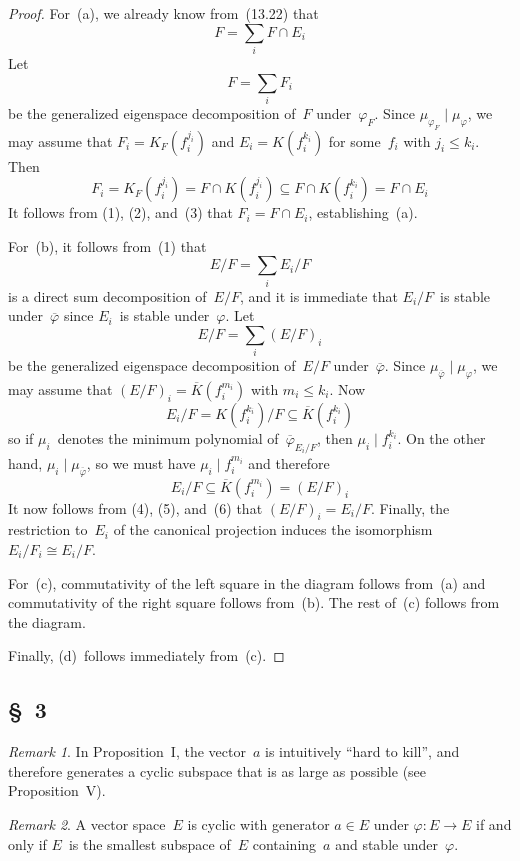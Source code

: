 \documentclass[letterpaper,12pt]{article}
\newcommand{\iso}{\cong}
\newcommand{\divides}{\mid}
\newcommand{\sect}{\cap}
\newcommand{\proj}[1]{\overline{#1}}
\theoremstyle{definition}
\theoremstyle{remark}
\newtheorem*{rmk}{Remark}
\begin{document}
\begin{proof}
For~(a), we already know from~(13.22) that
\[F=\sum_i F\sect E_i\tag{1}\]
Let
\[F=\sum_i F_i\tag{2}\]
be the generalized eigenspace decomposition of~\(F\) under~\(\varphi_F\). Since \(\mu_{\varphi_F}\divides\mu_{\varphi}\), we may assume that \(F_i=K_F(f_i^{j_i})\) and \(E_i=K(f_i^{k_i})\) for some~\(f_i\) with \(j_i\le k_i\). Then
\[F_i=K_F(f_i^{j_i})=F\sect K(f_i^{j_i})\subseteq F\sect K(f_i^{k_i})=F\sect E_i\tag{3}\]
It follows from (1), (2), and~(3) that \(F_i=F\sect E_i\), establishing~(a).

For~(b), it follows from~(1) that
\[E/F=\sum_i E_i/F\tag{4}\]
is a direct sum decomposition of~\(E/F\), and it is immediate that \(E_i/F\)~is stable under~\(\proj{\varphi}\) since \(E_i\)~is stable under~\(\varphi\). Let
\[E/F=\sum_i(E/F)_i\tag{5}\]
be the generalized eigenspace decomposition of~\(E/F\) under~\(\proj{\varphi}\). Since \(\mu_{\proj{\varphi}}\divides\mu_{\varphi}\), we may assume that \((E/F)_i=\proj{K}(f_i^{m_i})\) with \(m_i\le k_i\). Now
\[E_i/F=K(f_i^{k_i})/F\subseteq\proj{K}(f_i^{k_i})\]
so if \(\mu_i\)~denotes the minimum polynomial of~\(\proj{\varphi}_{E_i/F}\), then \(\mu_i\divides f_i^{k_i}\). On the other hand, \(\mu_i\divides\mu_{\proj{\varphi}}\), so we must have \(\mu_i\divides f_i^{m_i}\) and therefore
\[E_i/F\subseteq\proj{K}(f_i^{m_i})=(E/F)_i\tag{6}\]
It now follows from (4), (5), and~(6) that \((E/F)_i=E_i/F\). Finally, the restriction to~\(E_i\) of the canonical projection induces the isomorphism \(E_i/F_i\iso E_i/F\).

For~(c), commutativity of the left square in the diagram follows from~(a) and commutativity of the right square follows from~(b). The rest of~(c) follows from the diagram.

Finally, (d)~follows immediately from~(c).
\end{proof}

\subsection*{\S~3}
\begin{rmk}
In Proposition~I, the vector~\(a\) is intuitively ``hard to kill'', and therefore generates a cyclic subspace that is as large as possible (see Proposition~V).
\end{rmk}

\begin{rmk}
A vector space~\(E\) is cyclic with generator \(a\in E\) under \(\varphi:E\to E\) if and only if \(E\)~is the smallest subspace of~\(E\) containing~\(a\) and stable under~\(\varphi\).
\end{rmk}
\end{document}
